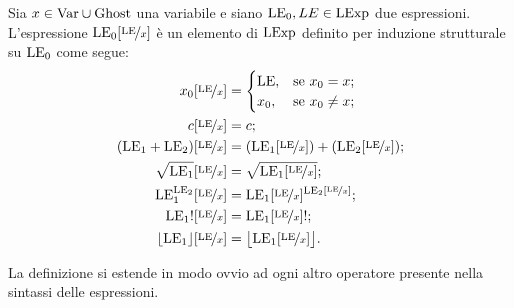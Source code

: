 \begin{definizione} 
Sia $x \in \mathrm{Var} \cup \mathrm{Ghost}$ una variabile e siano $\mathrm{LE}_0, LE \in \mathrm{LExp}$
due espressioni.
L'espressione $\mathrm{LE}_0[\nicefrac{\mathrm{LE}}{x}]$ è un elemento di $\mathrm{LExp}$ definito
per induzione strutturale su $\mathrm{LE}_0$ come segue:
\begin{align*}
   x_0[\nicefrac{\mathrm{LE}}{x}]
    &=
      \begin{cases}
        \mathrm{LE}, &\text{se $x_0 = x$;} \\
        x_0, &\text{se $x_0 \neq x$;}
      \end{cases} \\
   c[\nicefrac{\mathrm{LE}}{x}]
    &= c;\\
  (\mathrm{LE}_1 + \mathrm{LE}_2)[\nicefrac{\mathrm{LE}}{x}]
     &= (\mathrm{LE}_1[\nicefrac{\mathrm{LE}}{x}]) + (\mathrm{LE}_2[\nicefrac{\mathrm{LE}}{x}]);\\
  \sqrt{\mathrm{LE}_1}[\nicefrac{\mathrm{LE}}{x}]
     &= \sqrt{{\mathrm{LE}_1}[\nicefrac{\mathrm{LE}}{x}]};\\
  \mathrm{LE}_1^{\mathrm{LE}_2}[\nicefrac{\mathrm{LE}}{x}]
     &= \mathrm{LE}_1[\nicefrac{\mathrm{LE}}{x}]^{\mathrm{LE}_2[\nicefrac{\mathrm{LE}}{x}]};\\
  {\mathrm{LE}_1}![\nicefrac{\mathrm{LE}}{x}]
     &= {{\mathrm{LE}_1}[\nicefrac{\mathrm{LE}}{x}]}!;\\
  \lfloor \mathrm{LE}_1 \rfloor[\nicefrac{\mathrm{LE}}{x}]
     &= \bigl\lfloor \mathrm{LE}_1[\nicefrac{\mathrm{LE}}{x}] \bigr\rfloor.\\
\end{align*}
\end{definizione}
La definizione si estende in modo ovvio ad ogni altro operatore presente
nella sintassi delle espressioni.

